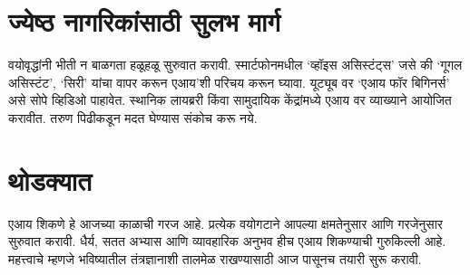 \section*{ज्येष्ठ नागरिकांसाठी सुलभ मार्ग}
वयोवृद्धांनी भीती न बाळगता हळूहळू सुरुवात करावी. स्मार्टफोनमधील `व्हॉइस असिस्टंट्स' जसे की `गूगल असिस्टंट', `सिरी' यांचा वापर करून एआय'शी परिचय करून घ्यावा.
यूट्यूब वर `एआय फॉर बिगिनर्स' असे सोपे व्हिडिओ पाहावेत. स्थानिक लायब्ररी किंवा सामुदायिक केंद्रांमध्ये एआय वर व्याख्याने आयोजित करावीत. तरुण पिढीकडून मदत घेण्यास संकोच करू नये.

\section*{थोडक्यात}
एआय शिकणे हे आजच्या काळाची गरज आहे. प्रत्येक वयोगटाने आपल्या क्षमतेनुसार आणि गरजेनुसार सुरुवात करावी. धैर्य, सतत अभ्यास आणि व्यावहारिक अनुभव हीच एआय शिकण्याची गुरुकिल्ली आहे. महत्त्वाचे म्हणजे भविष्यातील तंत्रज्ञानाशी तालमेळ राखण्यासाठी आज पासूनच तयारी सुरू करावी.